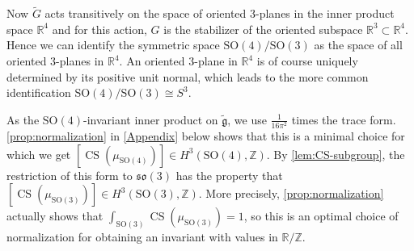 \documentclass[british,11pt,a4paper]{amsart}
\numberwithin{equation}{section}
\newcommand{\CS}{\operatorname{CS}}
\newcommand{\tfg}{\widetilde{\mathfrak g}}
\newcommand{\Z}{\mathbb{Z}}
\newcommand*{\R}{\mathbb{R}}
\numberwithin{theorem}{section}
\theoremstyle{definition}
\theoremstyle{remark}
\begin{document}
Now $\tilde G$ acts transitively on the space of oriented $3$-planes in the inner
product space $\R^4$ and for this action, $G$ is the stabilizer of the oriented
subspace $\R^3\subset\R^4$. Hence we can identify the symmetric space
$\mathrm{SO}(4)/\mathrm{SO}(3)$ as the space of all oriented $3$-planes in
$\R^4$.  An oriented $3$-plane in $\R^4$ is of course uniquely
  determined by its positive unit normal, which leads to the more common
  identification $\mathrm{SO}(4)/\mathrm{SO}(3)\cong S^3$. 

 As the $\mathrm{SO}(4)$-invariant inner product on $\tfg$, we use
  $\tfrac{1}{16\pi^2}$ times the trace form. \cref{prop:normalization} in
  \cref{Appendix} below shows that this is a minimal choice for which we get
  $[\CS(\mu_{\mathrm{SO}(4)})]\in H^3(\mathrm{SO}(4),\Z)$. By \cref{lem:CS-subgroup},  
  the restriction of this form to $\mathfrak{so}(3)$ has the property that
  $[\CS(\mu_{\mathrm{SO}(3)})]\in H^3(\mathrm{SO}(3),\Z)$. More precisely, 
  \cref{prop:normalization} actually shows that
  $\int_{\mathrm{SO}(3)}\CS(\mu_{\mathrm{SO}(3)})=1$, so this is an optimal choice of
  normalization for obtaining an invariant with values in $\R/\Z$.
\end{document}
